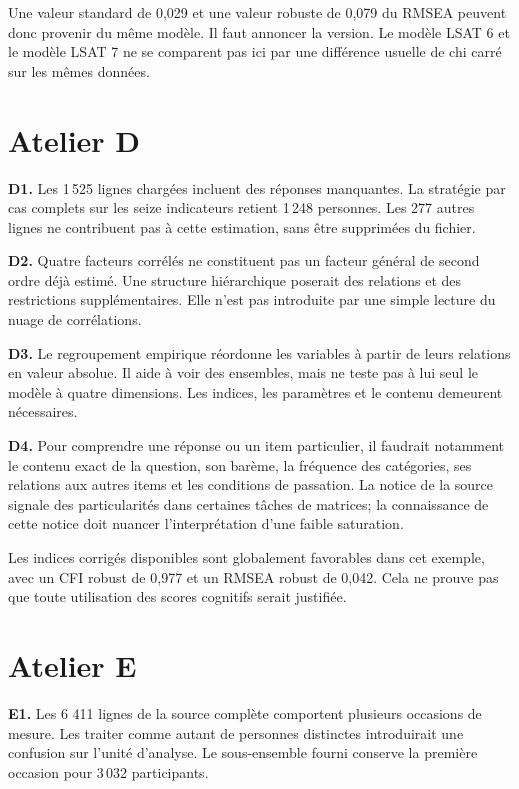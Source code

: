 \documentclass[
  french,
  11pt,
  a4paper,
  DIV=11,
  numbers=noendperiod]{scrreprt}
\begin{document}
Une valeur standard de 0,029 et une valeur robuste de 0,079 du RMSEA
peuvent donc provenir du même modèle. Il faut annoncer la version. Le
modèle LSAT 6 et le modèle LSAT 7 ne se comparent pas ici par une
différence usuelle de chi carré sur les mêmes données.

\section{Atelier D}\label{atelier-d}

\textbf{D1.} Les 1\,525 lignes chargées incluent des réponses
manquantes. La stratégie par cas complets sur les seize indicateurs
retient 1\,248 personnes. Les 277 autres lignes ne contribuent pas à
cette estimation, sans être supprimées du fichier.

\textbf{D2.} Quatre facteurs corrélés ne constituent pas un facteur
général de second ordre déjà estimé. Une structure hiérarchique poserait
des relations et des restrictions supplémentaires. Elle n'est pas
introduite par une simple lecture du nuage de corrélations.

\textbf{D3.} Le regroupement empirique réordonne les variables à partir
de leurs relations en valeur absolue. Il aide à voir des ensembles, mais
ne teste pas à lui seul le modèle à quatre dimensions. Les indices, les
paramètres et le contenu demeurent nécessaires.

\textbf{D4.} Pour comprendre une réponse ou un item particulier, il
faudrait notamment le contenu exact de la question, son barème, la
fréquence des catégories, ses relations aux autres items et les
conditions de passation. La notice de la source signale des
particularités dans certaines tâches de matrices; la connaissance de
cette notice doit nuancer l'interprétation d'une faible saturation.

Les indices corrigés disponibles sont globalement favorables dans cet
exemple, avec un CFI robust de 0,977 et un RMSEA robust de 0,042. Cela
ne prouve pas que toute utilisation des scores cognitifs serait
justifiée.

\section{Atelier E}\label{atelier-e}

\textbf{E1.} Les 6 411 lignes de la source complète comportent plusieurs
occasions de mesure. Les traiter comme autant de personnes distinctes
introduirait une confusion sur l'unité d'analyse. Le sous-ensemble
fourni conserve la première occasion pour 3\,032 participants.
\end{document}
